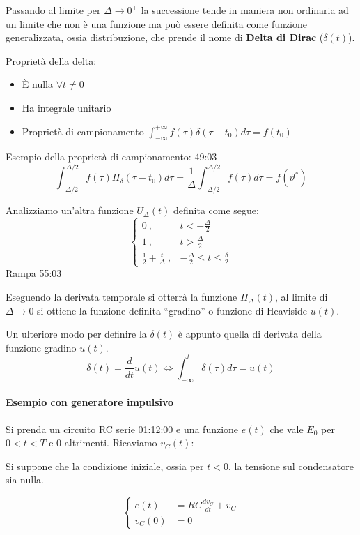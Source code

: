 Passando al limite per $\Delta \rightarrow 0^+$ la successione tende in maniera non ordinaria
ad un limite che non è una funzione ma può essere definita come funzione generalizzata,
ossia distribuzione, che prende il nome di \textbf{Delta di Dirac} ($\delta(t)$).

Proprietà della delta:
\begin{itemize}
\item È nulla $\forall t \neq 0$
\item Ha integrale unitario
\item Proprietà di campionamento $\int_{-\infty}^{+\infty}f(\tau)\delta(\tau-t_0)d\tau = f(t_0)$
\end{itemize}
Esempio della proprietà di campionamento: 49:03
$$
\int_{-\Delta/2}^{\Delta/2} f(\tau)\Pi_\delta(\tau-t_0)d\tau = \frac{1}{\Delta} \int_{-\Delta/2}^{\Delta/2}  f(\tau)d\tau = f(\vartheta^*)
$$


Analizziamo un'altra funzione $U_\Delta(t)$ definita come segue:
\begin{equation*}
\begin{cases}
0\ ,& t  < -\frac{\Delta}{2} \\
1\ ,& t  > \frac{\Delta}{2} \\
\frac{1}{2}+\frac{t}{\Delta}\ ,& -\frac{\Delta}{2} \leq t \leq \frac{\delta}{2}
\end{cases}
\end{equation*}
Rampa 55:03

Eseguendo la derivata temporale si otterrà la funzione $\Pi_\Delta(t)$, al limite di $\Delta \rightarrow 0$
si ottiene la funzione definita ``gradino'' o funzione di Heaviside $u(t)$.

Un ulteriore modo per definire la $\delta(t)$ è appunto quella di derivata della funzione gradino $u(t)$.
$$
\delta(t) = \frac{d}{dt}u(t) \Leftrightarrow \int_{-\infty}^t \delta(\tau)d\tau = u(t)
$$

\paragraph{Esempio con generatore impulsivo}
Si prenda un circuito RC serie 01:12:00 e una funzione $e(t)$ che vale $E_0$ per $0 < t < T$ e $0$ 
altrimenti.
Ricaviamo $v_C(t)$:

Si suppone che la condizione iniziale, ossia per $t < 0 $, la tensione sul condensatore sia nulla.

\begin{equation*}
\begin{cases}
e(t) &= RC\frac{dv_C}{dt} + v_C \\
v_C(0) &= 0
\end{cases}
\end{equation*}

